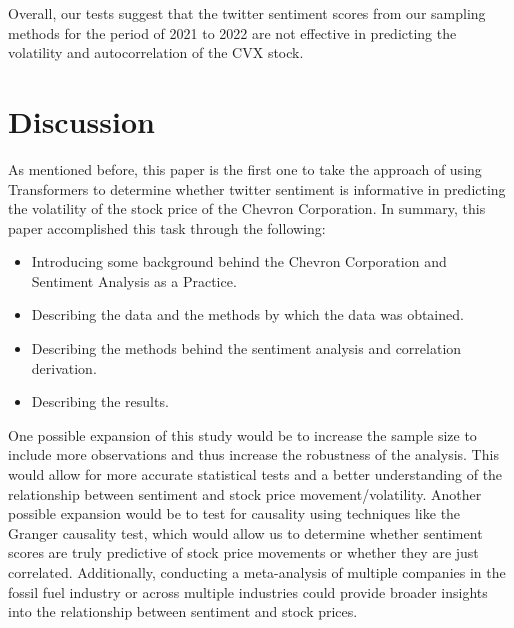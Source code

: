 \documentclass[12pt, letterpaper, titlepage]{article}
\newcommand{\jy}[1]{\textcolor{blue}{JY: #1}}
\begin{document}
Overall, our tests suggest that the twitter sentiment scores from our sampling methods for the period of 2021 to 2022 are not effective in predicting the volatility and autocorrelation of the CVX stock.

\label{sec: discussion}
\section{Discussion}

As mentioned before, this paper is the first one to take the approach of using Transformers to determine whether twitter sentiment is informative in predicting the volatility of the stock price of the Chevron Corporation. In summary, this paper accomplished this task through the following:
\begin{itemize}
    \item Introducing some background behind the Chevron Corporation and Sentiment Analysis as a Practice.
    \item Describing the data and the methods by which the data was obtained.
    \item Describing the methods behind the sentiment analysis and correlation derivation.
    \item Describing the results.
\end{itemize}




One possible expansion of this study would be to increase the sample size to include more observations and thus increase the robustness of the analysis. This would allow for more accurate statistical tests and a better understanding of the relationship between sentiment and stock price movement/volatility. Another possible expansion would be to test for causality using techniques like the Granger causality test, which would allow us to determine whether sentiment scores are truly predictive of stock price movements or whether they are just correlated. Additionally, conducting a meta-analysis of multiple companies in the fossil fuel industry or across multiple industries could provide broader insights into the relationship between sentiment and stock prices. 
\end{document}
